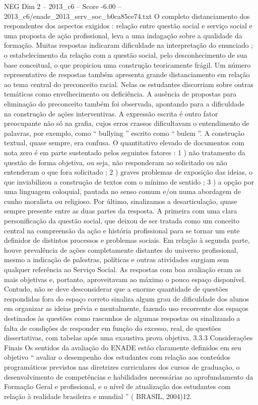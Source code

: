\begin{textsample}{NEG Dim 2 – 2013\_c6 – Score -6.00 – 2013\_c6/enade\_2013\_serv\_soc\_b0ca85ce74.txt}
O completo distanciamento dos respondentes dos aspectos exigidos : relação entre questão social e serviço social e uma proposta de ação profissional, leva a uma indagação sobre a qualidade da formação.
Muitas respostas indicaram dificuldade na interpretação do enunciado ; o estabelecimento da relação com a questão social, pelo desconhecimento de sua base conceitual, o que propiciou uma construção teoricamente frágil.
Um número representativo de respostas também apresenta grande distanciamento em relação ao tema central do preconceito racial.
Nelas os estudantes discorriam sobre outras temáticas como envelhecimento ou deficiência.
A ausência de propostas para eliminação do preconceito também foi observada, apontando para a dificuldade na construção de ações interventivas.
A expressão escrita é outro fator preocupante não só na grafia, cujos erros crassos dificultavam o entendimento de palavras, por exemplo, como “ bullying ” escrito como “ bulem ”.
A construção textual, quase sempre, era confusa.
O quantitativo elevado de documentos com nota zero é em parte sustentado pelos seguintes fatores : 1 ) não tratamento da questão de forma objetiva, ou seja, não responderam ao solicitado ou não entenderam o que fora solicitado ; 2 ) graves problemas de exposição das ideias, o que inviabilizou a construção de textos com o mínimo de sentido ; 3 ) a opção por uma linguagem coloquial, pautada no senso comum e/ou numa abordagem de cunho moralista ou religioso.
Por último, sinalizamos a desarticulação, quase sempre presente entre as duas partes da resposta.
A primeira com uma clara personificação da questão social, que deixou de ser tratada como um conceito central na compreensão da ação e história profissional para se tornar um ente definidor de distintos processos e problemas sociais.
Em relação à segunda parte, houve prevalência de ações completamente distantes do universo profissional, mesmo a indicação de palestras, políticas e outras atividades surgiam sem qualquer referência ao Serviço Social.
As respostas com boa avaliação eram as mais objetivas e, portanto, aproveitavam ao máximo o pouco espaço disponível.
Contudo, não se deve desconsiderar que a enorme quantidade de questões respondidas fora do espaço correto sinaliza algum grau de dificuldade dos alunos em organizar as ideias prévia e mentalmente, fazendo uso recorrente dos espaços destinados às questões como rascunhos de algumas respostas ou sinalizando a falta de condições de responder em função do excesso, real, de questões dissertativas, com tabelas após uma exaustiva prova objetiva. 3.3.3 Considerações Finais Os sentidos da avaliação do ENADE estão claramente definidos em seu objetivo “ avaliar o desempenho dos estudantes com relação aos conteúdos programáticos previstos nas diretrizes curriculares dos cursos de graduação, o desenvolvimento de competências e habilidades necessárias ao aprofundamento da Formação Geral e profissional, e o nível de atualização dos estudantes com relação à realidade brasileira e mundial ” ( BRASIL, 2004)12.

\end{textsample}
